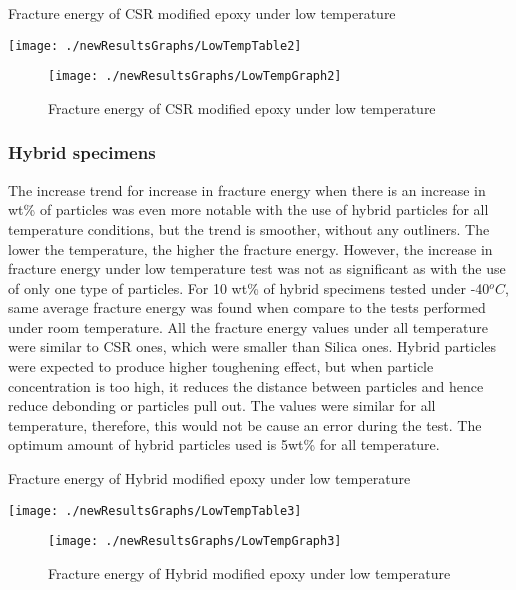 \documentclass[numbers=noendperiod,chapterprefix=on]{icldt} %
\begin{document}
\begin{table}[!hp]
\centering
\caption{Fracture energy of CSR modified epoxy under low temperature} %
\texttt{[image: ./newResultsGraphs/LowTempTable2]}
\end{table}
\FloatBarrier

\begin{figure}[!h]
\centering
\texttt{[image: ./newResultsGraphs/LowTempGraph2]}
\caption{Fracture energy of CSR modified epoxy under low temperature }
\end{figure}
\FloatBarrier

\subsubsection{Hybrid specimens}
The increase trend for increase in fracture energy when there is an increase in wt\% of particles was even more notable with the use of hybrid particles for all temperature conditions, but the trend is smoother, without any outliners. The lower the temperature, the higher the fracture energy. However, the increase in fracture energy under low temperature test was not as significant as with the use of only one type of particles. For 10 wt\% of hybrid specimens tested under -40$^oC$, same average fracture energy was found when compare to the tests performed under room temperature.  All the fracture energy values under all temperature were similar to CSR ones, which were smaller than Silica ones. Hybrid particles were expected to produce higher toughening effect, but when particle concentration is too high, it reduces the distance between particles and hence reduce debonding or particles pull out. The values were similar for all temperature, therefore, this would not be cause an error during the test. The optimum amount of hybrid particles used is 5wt\% for all temperature.


\begin{table}[!hp]
\centering
\caption{Fracture energy of Hybrid modified epoxy under low temperature} %
\texttt{[image: ./newResultsGraphs/LowTempTable3]}
\end{table}
\FloatBarrier

\begin{figure}[!hp]
\centering
\texttt{[image: ./newResultsGraphs/LowTempGraph3]}
\caption{Fracture energy of Hybrid modified epoxy under low temperature}
\end{figure}
\FloatBarrier
\end{document}
